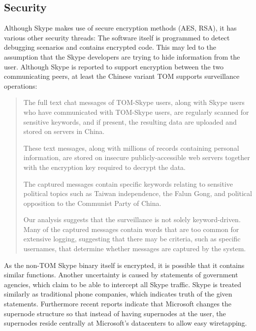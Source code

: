 \subsection{Security}
Although Skype makes use of secure encryption methods (AES, RSA), it has
various other security threads: The software itself is programmed to detect
debugging scenarios and contains encrypted code. This may led to the
assumption that the Skype developers are trying to hide information from the
user. Although Skype is reported to support encryption between the two
communicating peers\cite{skype:encrypted}, at least the Chinese variant TOM
supports surveillance operations:\cite{skype-tom}
\begin{quote}
The full text chat messages of TOM-Skype users, along with Skype users who have
communicated with TOM-Skype users, are regularly scanned for sensitive keywords, and
if present, the resulting data are uploaded and stored on servers in China.

These text messages, along with millions of records containing personal information, are
stored on insecure publicly-accessible web servers together with the encryption key required to
decrypt the data.

The captured messages contain specific keywords relating to sensitive political topics such
as Taiwan independence, the Falun Gong, and political opposition to the Communist Party
of China.

Our analysis suggests that the surveillance is not solely keyword-driven. Many of the
captured messages contain words that are too common for extensive logging, suggesting
that there may be criteria, such as specific usernames, that determine whether messages are
captured by the system.
\end{quote}
As the non-TOM Skype binary itself is encrypted, it is possible that it contains similar
functions.
Another uncertainty is caused by statements of government agencies, which
claim to be able to intercept all Skype traffic.
Skype is treated
similarly as traditional phone companies, which indicates truth of the given
statements.
Furthermore recent reports
indicate that Microsoft changes the supernode structure so that instead of having
supernodes at the user, the supernodes reside centrally at Microsoft's
datacenters to allow easy wiretapping.\cite{skype:supernodechange}
